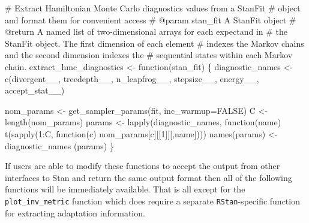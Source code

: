 \documentclass[
  letterpaper,
  DIV=11,
  numbers=noendperiod]{scrartcl}
\newenvironment{Shaded}{\begin{snugshade}}{\end{snugshade}}
\newcommand{\AttributeTok}[1]{\textcolor[rgb]{0.40,0.45,0.13}{#1}}
\newcommand{\CommentTok}[1]{\textcolor[rgb]{0.37,0.37,0.37}{#1}}
\newcommand{\ConstantTok}[1]{\textcolor[rgb]{0.56,0.35,0.01}{#1}}
\newcommand{\ControlFlowTok}[1]{\textcolor[rgb]{0.00,0.23,0.31}{#1}}
\newcommand{\DecValTok}[1]{\textcolor[rgb]{0.68,0.00,0.00}{#1}}
\newcommand{\FunctionTok}[1]{\textcolor[rgb]{0.28,0.35,0.67}{#1}}
\newcommand{\NormalTok}[1]{\textcolor[rgb]{0.00,0.23,0.31}{#1}}
\newcommand{\OtherTok}[1]{\textcolor[rgb]{0.00,0.23,0.31}{#1}}
\newcommand{\SpecialCharTok}[1]{\textcolor[rgb]{0.37,0.37,0.37}{#1}}
\newcommand{\StringTok}[1]{\textcolor[rgb]{0.13,0.47,0.30}{#1}}
\begin{document}
\begin{Shaded}
\begin{Highlighting}[]
\CommentTok{\# Extract Hamiltonian Monte Carlo diagnostics values from a StanFit}
\CommentTok{\# object and format them for convenient access}
\CommentTok{\# @param stan\_fit A StanFit object}
\CommentTok{\# @return A named list of two{-}dimensional arrays for each expectand in }
\CommentTok{\#         the StanFit object.  The first dimension of each element }
\CommentTok{\#         indexes the Markov chains and the second dimension indexes the }
\CommentTok{\#         sequential states within each Markov chain. }
\NormalTok{extract\_hmc\_diagnostics }\OtherTok{\textless{}{-}} \ControlFlowTok{function}\NormalTok{(stan\_fit) \{}
\NormalTok{  diagnostic\_names }\OtherTok{\textless{}{-}} \FunctionTok{c}\NormalTok{(}\StringTok{\textquotesingle{}divergent\_\_\textquotesingle{}}\NormalTok{, }\StringTok{\textquotesingle{}treedepth\_\_\textquotesingle{}}\NormalTok{, }\StringTok{\textquotesingle{}n\_leapfrog\_\_\textquotesingle{}}\NormalTok{, }
                        \StringTok{\textquotesingle{}stepsize\_\_\textquotesingle{}}\NormalTok{, }\StringTok{\textquotesingle{}energy\_\_\textquotesingle{}}\NormalTok{, }\StringTok{\textquotesingle{}accept\_stat\_\_\textquotesingle{}}\NormalTok{)}

\NormalTok{  nom\_params }\OtherTok{\textless{}{-}} \FunctionTok{get\_sampler\_params}\NormalTok{(fit, }\AttributeTok{inc\_warmup=}\ConstantTok{FALSE}\NormalTok{)}
\NormalTok{  C }\OtherTok{\textless{}{-}} \FunctionTok{length}\NormalTok{(nom\_params)}
\NormalTok{  params }\OtherTok{\textless{}{-}} \FunctionTok{lapply}\NormalTok{(diagnostic\_names, }
                   \ControlFlowTok{function}\NormalTok{(name) }\FunctionTok{t}\NormalTok{(}\FunctionTok{sapply}\NormalTok{(}\DecValTok{1}\SpecialCharTok{:}\NormalTok{C, }\ControlFlowTok{function}\NormalTok{(c) }
\NormalTok{                                  nom\_params[c][[}\DecValTok{1}\NormalTok{]][,name])))}
  \FunctionTok{names}\NormalTok{(params) }\OtherTok{\textless{}{-}}\NormalTok{ diagnostic\_names}
\NormalTok{  (params)}
\NormalTok{\}}
\end{Highlighting}
\end{Shaded}

If users are able to modify these functions to accept the output from
other interfaces to Stan and return the same output format then all of
the following functions will be immediately available. That is all
except for the \texttt{plot\_inv\_metric} function which does require a
separate \texttt{RStan}-specific function for extracting adaptation
information.
\end{document}

